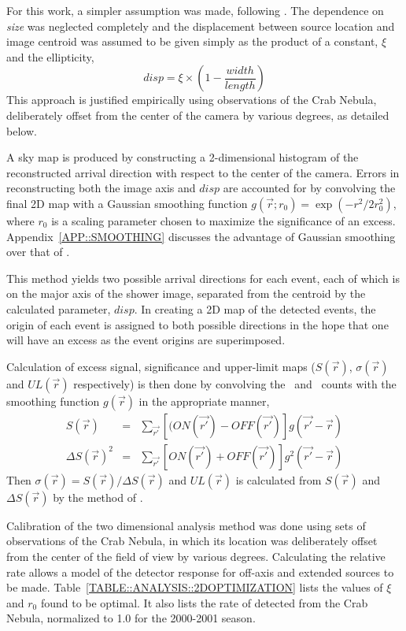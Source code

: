 For this work, a simpler assumption was made, following
\citet{REF::LESSARD::2001APP}. The dependence on \textit{size} was
neglected completely and the displacement between source location and
image centroid was assumed to be given simply as the product of a
constant, $\xi$ and the ellipticity,
\begin{equation}
\label{EQN::ANALYSIS::DISP}disp = \xi \times \left(1-\frac{width}{length}\right)
\end{equation}
This approach is justified empirically using observations of the Crab
Nebula, deliberately offset from the center of the camera by various
degrees, as detailed below.

A sky map is produced by constructing a 2-dimensional histogram
of the reconstructed arrival direction with respect to the center of
the camera. Errors in reconstructing both the image axis and $disp$
are accounted for by convolving the final 2D map with a Gaussian
smoothing function
\(g(\vec{r};r_0)= \exp(-r^2/2r_0^2)\), where $r_0$ is a scaling parameter
chosen to maximize the significance of an excess. 
Appendix~\ref{APP::SMOOTHING} discusses the advantage of Gaussian 
smoothing over that of \citet{REF::LESSARD::2001APP}.

This method yields two possible arrival directions for each event,
each of which is on the major axis of the shower image, separated from
the centroid by the calculated parameter, $disp$.  In creating a 2D
map of the detected events, the origin of each event is assigned to
both possible directions in the hope that one will have an excess as
the event origins are superimposed.

Calculation of excess signal, significance and upper-limit maps
($S(\vec{r})$, $\sigma(\vec{r})$ and $UL(\vec{r})$ respectively) is
then done by convolving the \On\ and \Off\ counts with the smoothing
function $g(\vec{r})$ in the appropriate manner,
\begin{eqnarray}
S(\vec{r}) & = & \sum_{\vec{r'}}{[(ON(\vec{r'})-OFF(\vec{r'})]g(\vec{r'}-\vec{r})} \label{EQN::ANALYSIS::SMOOTHEXCESS}\\
\Delta S(\vec{r})^2 & = & \sum_{\vec{r'}}{[ON(\vec{r'})+OFF(\vec{r'})]g^2(\vec{r'}-\vec{r})} \label{EQN::ANALYSIS::SMOOTHDELTAEXCESS}
\end{eqnarray}
Then $\sigma(\vec{r})=S(\vec{r})/\Delta S(\vec{r})$ and $UL(\vec{r})$
is calculated from $S(\vec{r})$ and $\Delta S(\vec{r})$ by the method
of \citet{REF::HELENE::1983NIM}.

Calibration of the two dimensional analysis method was done using sets
of observations of the Crab Nebula, in which its location was
deliberately offset from the center of the field of view by various
degrees. Calculating the relative \Gray rate allows a model of the
detector response for off-axis and extended sources to be made.
Table~\ref{TABLE::ANALYSIS::2DOPTIMIZATION} lists the values of $\xi$
and $r_0$ found to be optimal. It also lists the rate of \Grays
detected from the Crab Nebula, normalized to 1.0 for the 2000-2001
season.


